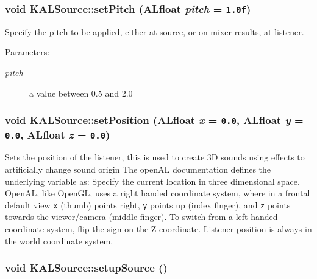 \hypertarget{class_k_a_l_source_052f5b82f78a130af322334e2a340d0a}{
\subsubsection[{setPitch}]{\setlength{\rightskip}{0pt plus 5cm}void KALSource::setPitch (ALfloat {\em pitch} = {\tt 1.0f})}}
\label{class_k_a_l_source_052f5b82f78a130af322334e2a340d0a}


Specify the pitch to be applied, either at source, or on mixer results, at listener. \begin{Desc}
\item[Parameters:]
\begin{description}
\item[{\em pitch}]a value between 0.5 and 2.0 \end{description}
\end{Desc}
\hypertarget{class_k_a_l_source_17250a60d4a3328cb9120cb4d9749187}{
\subsubsection[{setPosition}]{\setlength{\rightskip}{0pt plus 5cm}void KALSource::setPosition (ALfloat {\em x} = {\tt 0.0}, \/  ALfloat {\em y} = {\tt 0.0}, \/  ALfloat {\em z} = {\tt 0.0})}}
\label{class_k_a_l_source_17250a60d4a3328cb9120cb4d9749187}


Sets the position of the listener, this is used to create 3D sounds using effects to artificially change sound origin The openAL documentation defines the underlying variable as: Specify the current location in three dimensional space. OpenAL, like OpenGL, uses a right handed coordinate system, where in a frontal default view {\tt x} (thumb) points right, {\tt y} points up (index finger), and {\tt z} points towards the viewer/camera (middle finger). To switch from a left handed coordinate system, flip the sign on the Z coordinate. Listener position is always in the world coordinate system. \hypertarget{class_k_a_l_source_6f0c36e12e94b6fd3922aead49176576}{
\subsubsection[{setupSource}]{\setlength{\rightskip}{0pt plus 5cm}void KALSource::setupSource ()}}
\label{class_k_a_l_source_6f0c36e12e94b6fd3922aead49176576}


